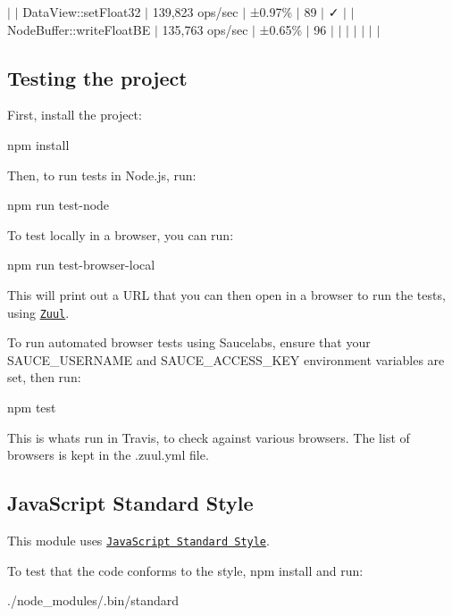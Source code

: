 $\vert$ $\vert$ Data\+View\+::set\+Float32 $\vert$ 139,823 ops/sec $\vert$ ±0.97\% $\vert$ 89 $\vert$ ✓ $\vert$ $\vert$ Node\+Buffer\+::write\+Float\+BE $\vert$ 135,763 ops/sec $\vert$ ±0.65\% $\vert$ 96 $\vert$ $\vert$ $\vert$ $\vert$ $\vert$ $\vert$ $\vert$

\subsection*{Testing the project}

First, install the project\+: \begin{DoxyVerb}npm install
\end{DoxyVerb}


Then, to run tests in Node.\+js, run\+: \begin{DoxyVerb}npm run test-node
\end{DoxyVerb}


To test locally in a browser, you can run\+: \begin{DoxyVerb}npm run test-browser-local
\end{DoxyVerb}


This will print out a U\+RL that you can then open in a browser to run the tests, using \href{https://github.com/defunctzombie/zuul}{\tt Zuul}.

To run automated browser tests using Saucelabs, ensure that your {\ttfamily S\+A\+U\+C\+E\+\_\+\+U\+S\+E\+R\+N\+A\+ME} and {\ttfamily S\+A\+U\+C\+E\+\_\+\+A\+C\+C\+E\+S\+S\+\_\+\+K\+EY} environment variables are set, then run\+: \begin{DoxyVerb}npm test
\end{DoxyVerb}


This is what\textquotesingle{}s run in Travis, to check against various browsers. The list of browsers is kept in the {\ttfamily .zuul.\+yml} file.

\subsection*{Java\+Script Standard Style}

This module uses \href{https://github.com/feross/standard}{\tt Java\+Script Standard Style}.

\href{https://github.com/feross/standard}{\tt }

To test that the code conforms to the style, {\ttfamily npm install} and run\+: \begin{DoxyVerb}./node_modules/.bin/standard
\end{DoxyVerb}


